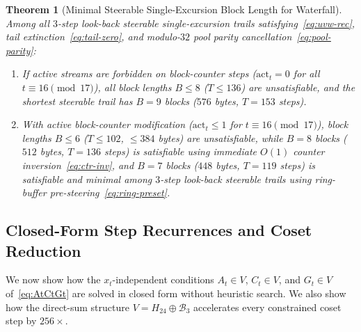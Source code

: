 \documentclass[11pt,a4paper]{article}
\newtheorem{theorem}{Theorem}
\theoremstyle{definition}
\theoremstyle{remark}
\begin{document}
\begin{theorem}[Minimal Steerable Single-Excursion Block Length for Waterfall]
\label{thm:min-blocks}
Among all $3$-step look-back steerable single-excursion trails satisfying~\eqref{eq:uvw-rec}, tail extinction~\eqref{eq:tail-zero}, and modulo-$32$ pool parity cancellation~\eqref{eq:pool-parity}:
\begin{enumerate}[leftmargin=2em]
    \item If active streams are forbidden on block-counter steps ($\mathrm{act}_t = 0$ for all $t \equiv 16 \pmod{17}$), all block lengths $B \le 8$ ($T \le 136$) are unsatisfiable, and the shortest steerable trail has $B = 9$ blocks ($576$ bytes, $T = 153$ steps).
    \item With active block-counter modification ($\mathrm{act}_t \le 1$ for $t \equiv 16 \pmod{17}$), block lengths $B \le 6$ ($T \le 102$, $\le 384$ bytes) are unsatisfiable, while $B = 8$ blocks ($512$ bytes, $T = 136$ steps) is satisfiable using immediate $O(1)$ counter inversion~\eqref{eq:ctr-inv}, and $B = 7$ blocks ($448$ bytes, $T = 119$ steps) is satisfiable and minimal among $3$-step look-back steerable trails using ring-buffer pre-steering~\eqref{eq:ring-preset}.
\end{enumerate}
\end{theorem}

\subsection{Closed-Form Step Recurrences and Coset Reduction}
\label{subsec:closed-form-walk}

We now show how the $x_t$-independent conditions $A_t \in V$, $C_t \in V$, and $G_t \in V$ of~\eqref{eq:AtCtGt} are solved in closed form without heuristic search. We also show how the direct-sum structure $V = H_{24} \oplus \mathcal{B}_3$ accelerates every constrained coset step by $256\times$.
\end{document}
